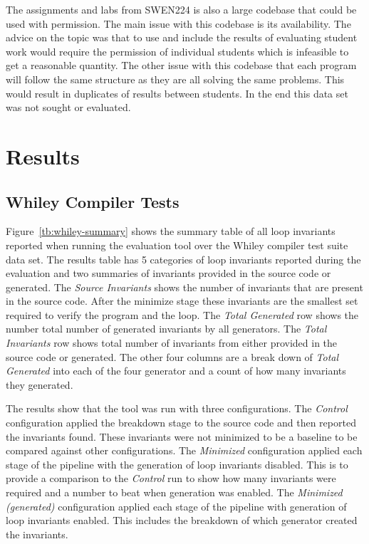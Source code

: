 The assignments and labs from SWEN224 is also a large codebase that could be
used with permission.
The main issue with this codebase is its availability.
The advice on the topic was that to use and include the results of
evaluating student work would require the permission of individual students
which is infeasible to get a reasonable quantity.
The other issue with this codebase that each program will follow the same
structure as they are all solving the same problems.
This would result in duplicates of results between students.
In the end this data set was not sought or evaluated.

\section{Results}

\subsection{Whiley Compiler Tests}

Figure~\ref{tb:whiley-summary} shows the summary table of all loop invariants
reported when running the evaluation tool over the Whiley compiler test suite data set.
The results table has 5 categories of loop invariants reported during the
evaluation and two summaries of invariants provided in the source code or generated.
The \textit{Source Invariants} shows the number of invariants that 
are present in the source code. After the minimize stage these
invariants are the smallest set required to verify the program and the loop.
The \textit{Total Generated} row shows the number total number of generated
invariants by all generators.
The \textit{Total Invariants} row shows total number of invariants from
either provided in the source code or generated.
The other four columns are a break down of \textit{Total Generated} 
into each of the four generator and a count of how many invariants they generated.

The results show that the tool was run with three configurations.
The \textit{Control} configuration applied the breakdown stage to the source
code and then reported the invariants found.
These invariants were not minimized to be a baseline to be compared against
other configurations.
The \textit{Minimized} configuration applied each stage of the pipeline with
the generation of loop invariants disabled.
This is to provide a comparison to the \textit{Control} run to show how many
invariants were required and a number to beat when generation was enabled.
The \textit{Minimized (generated)} configuration applied each stage of the
pipeline with generation of loop invariants enabled.
This includes the breakdown of which generator created the invariants.



